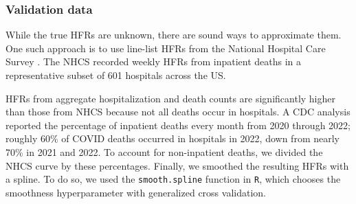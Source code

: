 \documentclass{article}
\newcommand{\ahcomment}[1]{{\color{red}[AH: #1]}}
\begin{document}

\subsubsection{Validation data}
While the true HFRs are unknown, there are sound ways to approximate them. One such approach is to use line-list HFRs from the National Hospital Care Survey \citep{NHCS2023}. The NHCS recorded weekly HFRs from inpatient deaths in a representative subset of 601 hospitals across the US. %

HFRs from aggregate hospitalization and death counts are significantly higher than those from NHCS because not all deaths occur in hospitals. A CDC analysis reported the percentage of inpatient deaths every month from 2020 through 2022; roughly 60\% of COVID deaths occurred in hospitals in 2022, down from nearly 70\% in 2021 and 2022. To account for non-inpatient deaths, we divided the NHCS curve by these percentages. Finally, we smoothed the resulting HFRs with a spline. To do so, we used the \texttt{smooth.spline} function in \texttt{R}, which chooses the smoothness hyperparameter with generalized cross validation. %

\end{document}
